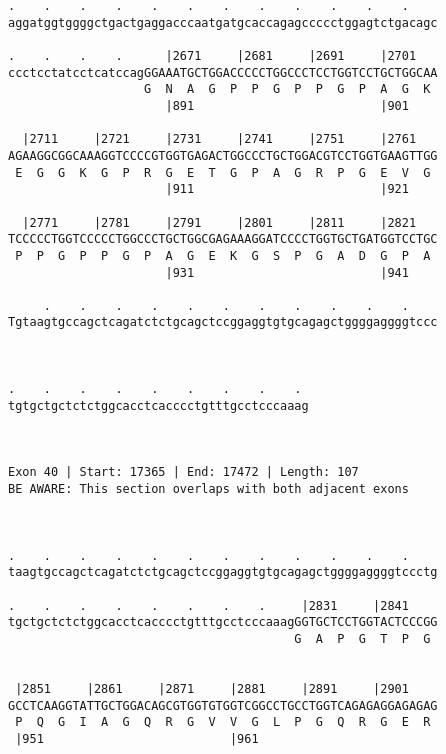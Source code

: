 \documentclass{article}
\begin{document}
\begin{Verbatim}
.    .    .    .    .    .    .    .    .    .    .    .    
aggatggtggggctgactgaggacccaatgatgcaccagagccccctggagtctgacagc
                                                            
.    .    .    .      |2671     |2681     |2691     |2701   
ccctcctatcctcatccagGGAAATGCTGGACCCCCTGGCCCTCCTGGTCCTGCTGGCAA
                   G  N  A  G  P  P  G  P  P  G  P  A  G  K 
                      |891                          |901    
  
  |2711     |2721     |2731     |2741     |2751     |2761   
AGAAGGCGGCAAAGGTCCCCGTGGTGAGACTGGCCCTGCTGGACGTCCTGGTGAAGTTGG
 E  G  G  K  G  P  R  G  E  T  G  P  A  G  R  P  G  E  V  G 
                      |911                          |921    
  
  |2771     |2781     |2791     |2801     |2811     |2821   
TCCCCCTGGTCCCCCTGGCCCTGCTGGCGAGAAAGGATCCCCTGGTGCTGATGGTCCTGC
 P  P  G  P  P  G  P  A  G  E  K  G  S  P  G  A  D  G  P  A 
                      |931                          |941    
  
     .    .    .    .    .    .    .    .    .    .    .    
Tgtaagtgccagctcagatctctgcagctccggaggtgtgcagagctggggaggggtccc
                                                            
                                                            
  
.    .    .    .    .    .    .    .    . 
tgtgctgctctctggcacctcacccctgtttgcctcccaaag
                                          
                                          
 
Exon 40 | Start: 17365 | End: 17472 | Length: 107
BE AWARE: This section overlaps with both adjacent exons



.    .    .    .    .    .    .    .    .    .    .    .    
taagtgccagctcagatctctgcagctccggaggtgtgcagagctggggaggggtccctg
                                                            
.    .    .    .    .    .    .    .     |2831     |2841    
tgctgctctctggcacctcacccctgtttgcctcccaaagGGTGCTCCTGGTACTCCCGG
                                        G  A  P  G  T  P  G 
                                                            
  
 |2851     |2861     |2871     |2881     |2891     |2901    
GCCTCAAGGTATTGCTGGACAGCGTGGTGTGGTCGGCCTGCCTGGTCAGAGAGGAGAGAG
 P  Q  G  I  A  G  Q  R  G  V  V  G  L  P  G  Q  R  G  E  R 
 |951                          |961                         
  

\end{Verbatim}
\end{document}
